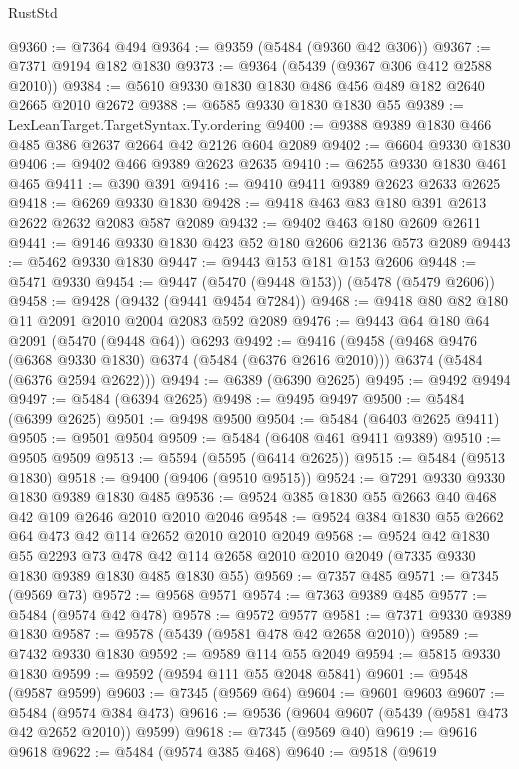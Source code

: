 \begin{lexlean}{RustStd}
\begin{coremodule}
{\begin{coremodule}
{{{{{{{{{{{{{{{{{{{{{{{{{{{{{{{@9360 := @7364 @494
@9364 := @9359 (@5484 (@9360 @42 @306))
@9367 := @7371 @9194 @182 @1830
@9373 := @9364 (@5439 (@9367 @306 @412 @2588 @2010))
@9384 := @5610 @9330 @1830 @1830 @486 @456 @489 @182 @2640 @2665 @2010 @2672
@9388 := @6585 @9330 @1830 @1830 @55
@9389 := LexLeanTarget.TargetSyntax.Ty.ordering
@9400 := @9388 @9389 @1830 @466 @485 @386 @2637 @2664 @42 @2126 @604 @2089
@9402 := @6604 @9330 @1830
@9406 := @9402 @466 @9389 @2623 @2635
@9410 := @6255 @9330 @1830 @461 @465
@9411 := @390 @391
@9416 := @9410 @9411 @9389 @2623 @2633 @2625
@9418 := @6269 @9330 @1830
@9428 := @9418 @463 @83 @180 @391 @2613 @2622 @2632 @2083 @587 @2089
@9432 := @9402 @463 @180 @2609 @2611
@9441 := @9146 @9330 @1830 @423 @52 @180 @2606 @2136 @573 @2089
@9443 := @5462 @9330 @1830
@9447 := @9443 @153 @181 @153 @2606
@9448 := @5471 @9330
@9454 := @9447 (@5470 (@9448 @153)) (@5478 (@5479 @2606))
@9458 := @9428 (@9432 (@9441 @9454 @7284))
@9468 := @9418 @80 @82 @180 @11 @2091 @2010 @2004 @2083 @592 @2089
@9476 := @9443 @64 @180 @64 @2091 (@5470 (@9448 @64)) @6293
@9492 := @9416
    (@9458
      (@9468 @9476 (@6368 @9330 @1830) @6374 (@5484 (@6376 @2616 @2010)))
      @6374
      (@5484 (@6376 @2594 @2622)))
@9494 := @6389 (@6390 @2625)
@9495 := @9492 @9494
@9497 := @5484 (@6394 @2625)
@9498 := @9495 @9497
@9500 := @5484 (@6399 @2625)
@9501 := @9498 @9500
@9504 := @5484 (@6403 @2625 @9411)
@9505 := @9501 @9504
@9509 := @5484 (@6408 @461 @9411 @9389)
@9510 := @9505 @9509
@9513 := @5594 (@5595 (@6414 @2625))
@9515 := @5484 (@9513 @1830)
@9518 := @9400 (@9406 (@9510 @9515))
@9524 := @7291 @9330 @9330 @1830 @9389 @1830 @485
@9536 := @9524 @385 @1830 @55 @2663 @40 @468 @42 @109 @2646 @2010 @2010 @2046
@9548 := @9524 @384 @1830 @55 @2662 @64 @473 @42 @114 @2652 @2010 @2010 @2049
@9568 := @9524
    @42
    @1830
    @55
    @2293
    @73
    @478
    @42
    @114
    @2658
    @2010
    @2010
    @2049
    (@7335 @9330 @1830 @9389 @1830 @485 @1830 @55)
@9569 := @7357 @485
@9571 := @7345 (@9569 @73)
@9572 := @9568 @9571
@9574 := @7363 @9389 @485
@9577 := @5484 (@9574 @42 @478)
@9578 := @9572 @9577
@9581 := @7371 @9330 @9389 @1830
@9587 := @9578 (@5439 (@9581 @478 @42 @2658 @2010))
@9589 := @7432 @9330 @1830
@9592 := @9589 @114 @55 @2049
@9594 := @5815 @9330 @1830
@9599 := @9592 (@9594 @111 @55 @2048 @5841)
@9601 := @9548 (@9587 @9599)
@9603 := @7345 (@9569 @64)
@9604 := @9601 @9603
@9607 := @5484 (@9574 @384 @473)
@9616 := @9536 (@9604 @9607 (@5439 (@9581 @473 @42 @2652 @2010)) @9599)
@9618 := @7345 (@9569 @40)
@9619 := @9616 @9618
@9622 := @5484 (@9574 @385 @468)
@9640 := @9518
    (@9619
}}}}}}}}}}}}}}}}}}}}}}}}}}}}}}}
\end{coremodule}}
\end{coremodule}
\end{lexlean}
